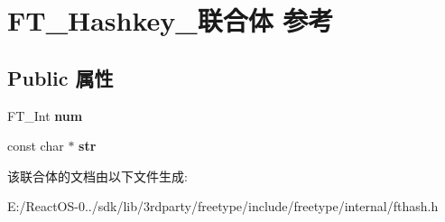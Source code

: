 \hypertarget{union_f_t___hashkey__}{}\section{F\+T\+\_\+\+Hashkey\+\_\+联合体 参考}
\label{union_f_t___hashkey__}
\subsection*{Public 属性}
\begin{DoxyCompactItemize}
\item 
\mbox{\label{union_f_t___hashkey___a9230a94728a573adf8c0d64832371036}} 
F\+T\+\_\+\+Int {\bfseries num}
\item 
\mbox{\label{union_f_t___hashkey___a124773889bfb1535163deb2579baab83}} 
const char $\ast$ {\bfseries str}
\end{DoxyCompactItemize}


该联合体的文档由以下文件生成\+:\begin{DoxyCompactItemize}
\item 
E\+:/\+React\+O\+S-\/0../sdk/lib/3rdparty/freetype/include/freetype/internal/fthash.\+h\end{DoxyCompactItemize}
